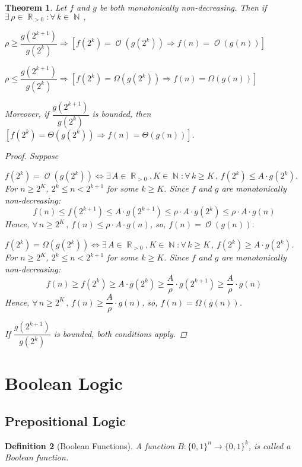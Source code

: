 \documentclass[12pt]{article}
\let\RA\Rightarrow
\let\LR\Leftrightarrow
\newcommand{\Forall}[1]{\forall\,{#1}\,,\,}
\newcommand{\Exist}[1]{\exists\,{#1}:}
\DeclareMathOperator{\N}{\mathbb{N}}
\DeclareMathOperator{\R}{\mathbb{R}}
\DeclareMathOperator{\Ord}{\mathcal{O}}
\newcommand*{\B}{\{0,1\}}
\newtheorem{theorem}{Theorem}[subsection]
\newtheorem{definition}[theorem]{Definition}
\begin{document}
\begin{theorem}
  Let $f$ and $g$ be both monotonically non-decreasing. Then if $\Exist{\rho\in\R_{>0}}\Forall{k\in\N}$
  \begin{compactenum}[(i)]
    \item $\rho\geq\dfrac{g(2^{k+1})}{g(2^k)}\RA [f(2^k)=\Ord(g(2^k))\RA f(n)=\Ord(g(n))]$
    \item $\rho\leq\dfrac{g(2^{k+1})}{g(2^k)}\RA [f(2^k)=\Omega(g(2^k))\RA f(n)=\Omega(g(n))]$
  \end{compactenum}
  Moreover, if $\dfrac{g(2^{k+1})}{g(2^k)}$ is bounded, then $[f(2^k)=\Theta(g(2^k))\RA f(n)=\Theta(g(n))]$.
  \begin{proof}
    Suppose 
    \begin{compactenum}[(i)]
      \item $f(2^k)=\Ord(g(2^k))\LR\Exist{A\in\R_{>0},K\in\N}\Forall{k\geq K}f(2^k)\leq A\cdot g(2^k)$. For $n\geq 2^K$, $2^k\leq n<2^{k+1}$ for some $k\geq K$. Since $f$ and $g$ are monotonically non-decreasing: $$f(n)\leq f(2^{k+1})\leq A\cdot g(2^{k+1})\leq \rho\cdot A\cdot g(2^k)\leq \rho\cdot A\cdot g(n)$$ Hence, $\Forall{n\geq 2^K}f(n)\leq \rho\cdot A\cdot g(n)$, so, $f(n)=\Ord(g(n))$.
      \item $f(2^k)=\Omega(g(2^k))\LR\Exist{A\in\R_{>0},K\in\N}\Forall{k\geq K}f(2^k)\geq A\cdot g(2^k)$. For $n\geq 2^K$, $2^k\leq n<2^{k+1}$ for some $k\geq K$. Since $f$ and $g$ are monotonically non-decreasing: $$f(n)\geq f(2^k)\geq A\cdot g(2^k)\geq \frac{A}{\rho}\cdot g(2^{k+1})\geq \frac{A}{\rho}\cdot g(n)$$ Hence, $\Forall{n\geq 2^K}f(n)\geq \dfrac{A}{\rho}\cdot g(n)$, so, $f(n)=\Omega(g(n))$.
    \end{compactenum}
    If $\dfrac{g(2^{k+1})}{g(2^k)}$ is bounded, both conditions apply.
  \end{proof}
\end{theorem}

\pagebreak 

\section{Boolean Logic}

\subsection{Prepositional Logic}

\begin{definition}[Boolean Functions]
  A function $B:\B^n\to \B^k$, is called a Boolean function.
\end{definition}
\end{document}
